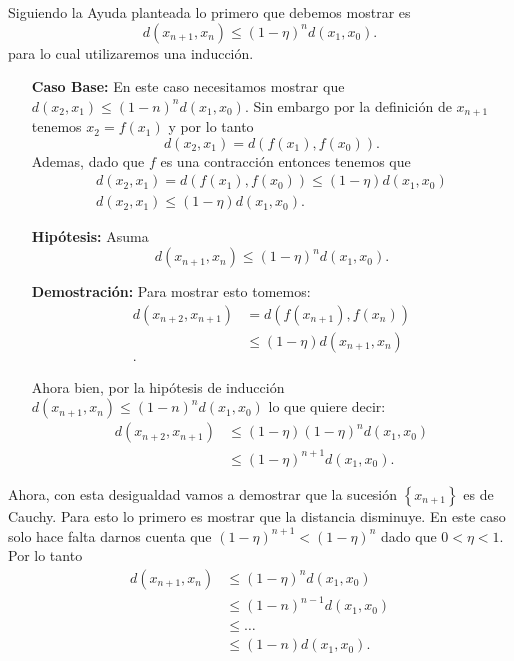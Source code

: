 \documentclass{report}
\begin{document}
Siguiendo la Ayuda planteada lo primero que debemos mostrar es \[
d\left( x_{n+1}, x_{n} \right) \le \left( 1 - \eta \right)^{n}d\left( x_1, x_0 \right) 
.\] para lo cual utilizaremos una inducción. 
\begin{enumerate}
  \item[\textbf{Caso Base:}] En este caso necesitamos mostrar que $d\left( x_{2}, x_{1} \right) \le \left( 1 - n \right)^{n}d\left( x_1, x_0 \right) $. Sin embargo por la definición de $x_{n+1}$ tenemos $x_2 = f\left( x_1 \right) $ y por lo tanto \[
  d\left( x_2, x_1 \right) = d\left( f\left( x_1 \right) , f\left( x_0 \right)  \right) 
  .\]  Ademas, dado que $f$ es una contracción entonces tenemos que
  \begin{align*}
  d\left( x_2, x_1 \right) = d\left( f\left( x_1 \right) , f\left( x_0 \right)  \right) \le \left( 1 - \eta \right) d\left( x_1, x_0 \right) \\
  d\left( x_2, x_1 \right) \le  \left( 1 - \eta \right) d\left( x_1, x_0 \right) 
  .\end{align*}
\item[\textbf{Hipótesis:}] Asuma \[
d\left( x_{n+1}, x_{n} \right) \le \left( 1 - \eta \right)^{n}d\left( x_1, x_0 \right) 
.\] 
\item[\textbf{Demostración:}] Para mostrar esto tomemos:
  \begin{align*}
    d\left( x_{n + 2}, x_{n + 1} \right) &= d\left( f\left( x_{n + 1} \right), f\left( x_{n} \right)  \right) \\
					 &\le \left( 1 - \eta \right) d\left( x_{n +1}, x_n \right) \\
  .\end{align*}

  Ahora bien, por la hipótesis de inducción $d\left( x_{n + 1}, x_n \right) \le \left( 1 - n \right)^{n} d\left( x_1, x_0 \right) $ lo que quiere decir:
  \begin{align*}
    d\left( x_{n + 2}, x_{n + 1} \right)  &\le \left( 1 - \eta \right) \left( 1 - \eta \right)^{n} d\left( x_1, x_0 \right) \\
					  &\le \left( 1 - \eta \right)^{n + 1} d\left( x_1, x_0 \right) 
  .\end{align*}
\end{enumerate}

Ahora, con esta desigualdad vamos a demostrar que la sucesión $\left\{ x_{n + 1} \right\} $ es de Cauchy. Para esto lo primero es mostrar que la distancia disminuye. En este caso solo hace falta darnos cuenta que $\left( 1 - \eta \right)^{n + 1} < \left( 1 - \eta \right)^{n}$ dado que $0 < \eta < 1$. Por lo tanto
 \begin{align*}
   d\left( x_{n + 1}, x_{n} \right) &\le \left( 1 - \eta \right)^{n} d\left( x_1, x_0 \right) \\
				    &\le \left( 1 - n \right)^{n - 1} d\left( x_1, x_0 \right) \\
				    &\le  \ldots\\
				    &\le \left( 1 - n \right) d\left( x_1, x_0 \right) 
.\end{align*}
\end{document}
